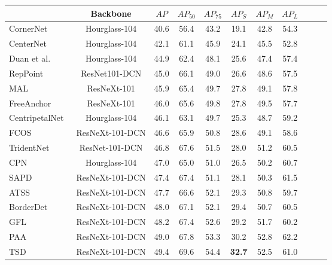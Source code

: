 \documentclass{article}
\begin{document}
\begin{table*}[t]
\centering
\begin{tabular}{@{}l@{\ \ \ \ }c@{\ \ \ \ }c@{\ \ \ \ }c@{\ \ \ \ }c@{\ \ \ \ }c@{\ \ \ \ }c@{\ \ \ \ }c@{\ \ \ \ }c@{\ \ \ \ }c@{\ \ \ \ }c@{}}
\toprule
& Backbone & $AP$ & $AP_{50}$ & $AP_{75}$ & $AP_{S}$ & $AP_{M}$ & $AP_{L}$  \\
\midrule
        CornerNet~\cite{Law_2018_ECCV} & Hourglass-104 & 40.6 & 56.4 & 43.2 & 19.1 & 42.8 & 54.3 \\
        CenterNet~\cite{zhou2019objects} & Hourglass-104 & 42.1 & 61.1& 45.9 & 24.1 & 45.5 & 52.8\\
        Duan et al.~\cite{duan2019centernet} & Hourglass-104 &  44.9 & 62.4 & 48.1 & 25.6 & 47.4 & 57.4 \\
        RepPoint~\cite{yang2019reppoints} & ResNet101-DCN &45.0 & 66.1 & 49.0 & 26.6 & 48.6 & 57.5 \\
        MAL~\cite{ke2020multiple} & ResNeXt-101 &  45.9 & 65.4 & 49.7 & 27.8 & 49.1 & 57.8 \\
        FreeAnchor~\cite{zhang2019freeanchor} & ResNeXt-101 & 46.0 & 65.6 & 49.8 & 27.8 & 49.5 & 57.7 \\
        CentripetalNet~\cite{Dong_2020_CVPR} & Hourglass-104 & 46.1 & 63.1 & 49.7 & 25.3 & 48.7 & 59.2 \\
        FCOS~\cite{tian2019fcos} & ResNeXt-101-DCN & 46.6 & 65.9 & 50.8 & 28.6 & 49.1 & 58.6 \\
        TridentNet~\cite{li2019scale} & ResNet-101-DCN & 46.8 & 67.6 & 51.5 & 28.0 & 51.2 & 60.5 \\
        CPN~\cite{duan2020corner} & Hourglass-104 & 47.0 & 65.0 & 51.0 & 26.5 & 50.2 & 60.7\\
        SAPD~\cite{zhu2019soft} & ResNeXt-101-DCN & 47.4 & 67.4 & 51.1 & 28.1 & 50.3 & 61.5\\
        ATSS~\cite{zhang2020bridging} & ResNeXt-101-DCN & 47.7 & 66.6 & 52.1 & 29.3 & 50.8 & 59.7 \\
        BorderDet~\cite{yang2019reppoints} & ResNeXt-101-DCN & 48.0 & 67.1 & 52.1 & 29.4 & 50.7 & 60.5 \\
        GFL~\cite{li2020generalized} & ResNeXt-101-DCN &  48.2 & 67.4 & 52.6 & 29.2 & 51.7 & 60.2 \\
        PAA~\cite{paa-eccv2020} & ResNeXt-101-DCN & 49.0 & 67.8 & 53.3 & 30.2 & 52.8 & 62.2 \\
        TSD~\cite{song2020revisiting} & ResNeXt-101-DCN & 49.4 & 69.6 & 54.4 & \textbf{32.7} & 52.5 & 61.0 \\

\end{tabular}
\end{table*}
\end{document}
